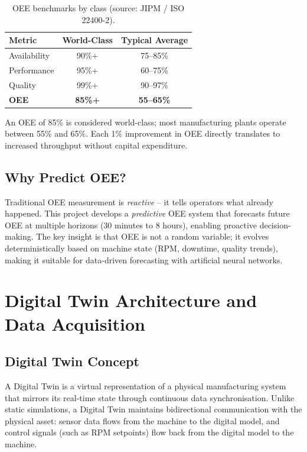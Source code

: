 \documentclass[a4paper,11pt]{article}
\begin{document}
\begin{table}[h]
\centering
\begin{tabular}{@{}lcc@{}}
\toprule
\textbf{Metric} & \textbf{World-Class} & \textbf{Typical Average} \\
\midrule
Availability & 90\%+ & 75--85\% \\
Performance & 95\%+ & 60--75\% \\
Quality & 99\%+ & 90--97\% \\
\textbf{OEE} & \textbf{85\%+} & \textbf{55--65\%} \\
\bottomrule
\end{tabular}
\caption{OEE benchmarks by class (source: JIPM / ISO 22400-2).}
\end{table}

An OEE of 85\% is considered world-class; most manufacturing plants operate between 55\% and 65\%. Each 1\% improvement in OEE directly translates to increased throughput without capital expenditure.

\subsection{Why Predict OEE?}

Traditional OEE measurement is \emph{reactive} -- it tells operators what already happened. This project develops a \emph{predictive} OEE system that forecasts future OEE at multiple horizons (30 minutes to 8 hours), enabling proactive decision-making. The key insight is that OEE is not a random variable; it evolves deterministically based on machine state (RPM, downtime, quality trends), making it suitable for data-driven forecasting with artificial neural networks.

\section{Digital Twin Architecture and Data Acquisition}

\subsection{Digital Twin Concept}

A Digital Twin is a virtual representation of a physical manufacturing system that mirrors its real-time state through continuous data synchronisation. Unlike static simulations, a Digital Twin maintains bidirectional communication with the physical asset: sensor data flows from the machine to the digital model, and control signals (such as RPM setpoints) flow back from the digital model to the machine.
\end{document}
